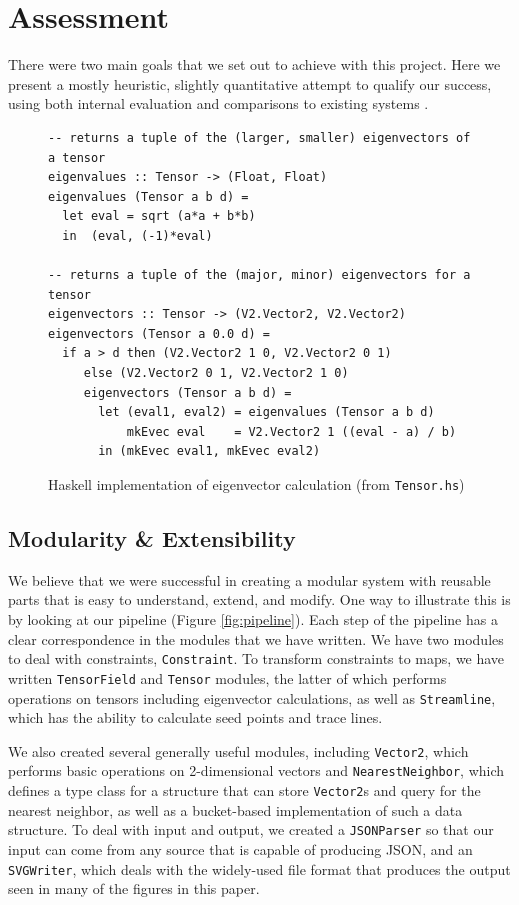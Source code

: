 \documentclass[twocolumn]{article}
\begin{document}
\section{Assessment}
There were two main goals that we set out to achieve with this project. Here we
present a mostly heuristic, slightly quantitative attempt to qualify our
success, using both internal evaluation and comparisons to existing systems
\cite{chen}.

\begin{figure}[t!]
\begin{verbatim}
-- returns a tuple of the (larger, smaller) eigenvectors of a tensor
eigenvalues :: Tensor -> (Float, Float)
eigenvalues (Tensor a b d) =
  let eval = sqrt (a*a + b*b)
  in  (eval, (-1)*eval)

-- returns a tuple of the (major, minor) eigenvectors for a tensor
eigenvectors :: Tensor -> (V2.Vector2, V2.Vector2)
eigenvectors (Tensor a 0.0 d) =
  if a > d then (V2.Vector2 1 0, V2.Vector2 0 1)
     else (V2.Vector2 0 1, V2.Vector2 1 0)
     eigenvectors (Tensor a b d) =
       let (eval1, eval2) = eigenvalues (Tensor a b d)
           mkEvec eval    = V2.Vector2 1 ((eval - a) / b)
       in (mkEvec eval1, mkEvec eval2)
\end{verbatim}
\caption{Haskell implementation of eigenvector calculation (from
            \texttt{Tensor.hs})}
\label{fig:evecs}
\end{figure}

\subsection{Modularity \& Extensibility}
We believe that we were successful in creating a modular system with reusable
parts that is easy to understand, extend, and modify. One way to illustrate
this is by looking at our pipeline (Figure \ref{fig:pipeline}). Each step of
the pipeline has a clear correspondence in the modules that we have written.
We have two modules to deal with constraints, \texttt{Constraint}. To transform
constraints to maps, we have written \texttt{TensorField} and \texttt{Tensor}
modules, the latter of which performs operations on tensors including
eigenvector calculations, as well as \texttt{Streamline}, which has the ability
to calculate seed points and trace lines.

We also created several generally useful modules, including \texttt{Vector2},
which performs basic operations on 2-dimensional vectors and
\texttt{NearestNeighbor}, which defines a type class for a structure that can
store \texttt{Vector2}s and query for the nearest neighbor, as well as a
bucket-based implementation of such a data structure. To deal with input and
output, we created a \texttt{JSONParser} so that our input can come from any
source that is capable of producing JSON, and an \texttt{SVGWriter}, which
deals with the widely-used file format that produces the output seen in many of
the figures in this paper.
\end{document}
